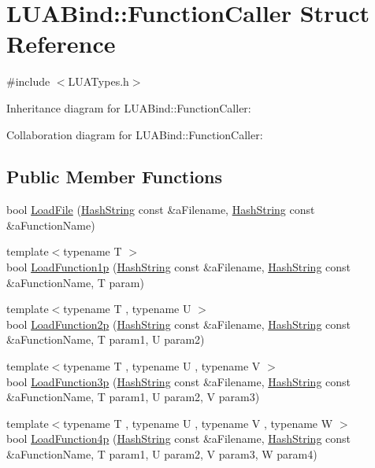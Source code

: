 \hypertarget{structLUABind_1_1FunctionCaller}{}\section{L\+U\+A\+Bind\+:\+:Function\+Caller Struct Reference}
\label{structLUABind_1_1FunctionCaller}


{\ttfamily \#include $<$L\+U\+A\+Types.\+h$>$}



Inheritance diagram for L\+U\+A\+Bind\+:\+:Function\+Caller\+:


Collaboration diagram for L\+U\+A\+Bind\+:\+:Function\+Caller\+:
\subsection*{Public Member Functions}
\begin{DoxyCompactItemize}
\item 
bool \hyperlink{structLUABind_1_1FunctionCaller_a9c2476ff626d4107e7f243301dc64d97}{Load\+File} (\hyperlink{classHashString}{Hash\+String} const \&a\+Filename, \hyperlink{classHashString}{Hash\+String} const \&a\+Function\+Name)
\item 
{\footnotesize template$<$typename T $>$ }\\bool \hyperlink{structLUABind_1_1FunctionCaller_a79326b143bc5319e43bc94011f654cfe}{Load\+Function1p} (\hyperlink{classHashString}{Hash\+String} const \&a\+Filename, \hyperlink{classHashString}{Hash\+String} const \&a\+Function\+Name, T param)
\item 
{\footnotesize template$<$typename T , typename U $>$ }\\bool \hyperlink{structLUABind_1_1FunctionCaller_a9f412b75f03ac575ec5ec5aef8692146}{Load\+Function2p} (\hyperlink{classHashString}{Hash\+String} const \&a\+Filename, \hyperlink{classHashString}{Hash\+String} const \&a\+Function\+Name, T param1, U param2)
\item 
{\footnotesize template$<$typename T , typename U , typename V $>$ }\\bool \hyperlink{structLUABind_1_1FunctionCaller_ae5dbcae36a95512027073aaaa14bdabd}{Load\+Function3p} (\hyperlink{classHashString}{Hash\+String} const \&a\+Filename, \hyperlink{classHashString}{Hash\+String} const \&a\+Function\+Name, T param1, U param2, V param3)
\item 
{\footnotesize template$<$typename T , typename U , typename V , typename W $>$ }\\bool \hyperlink{structLUABind_1_1FunctionCaller_adde10aa3429f709b745912c39ac0eca8}{Load\+Function4p} (\hyperlink{classHashString}{Hash\+String} const \&a\+Filename, \hyperlink{classHashString}{Hash\+String} const \&a\+Function\+Name, T param1, U param2, V param3, W param4)
\end{DoxyCompactItemize}
